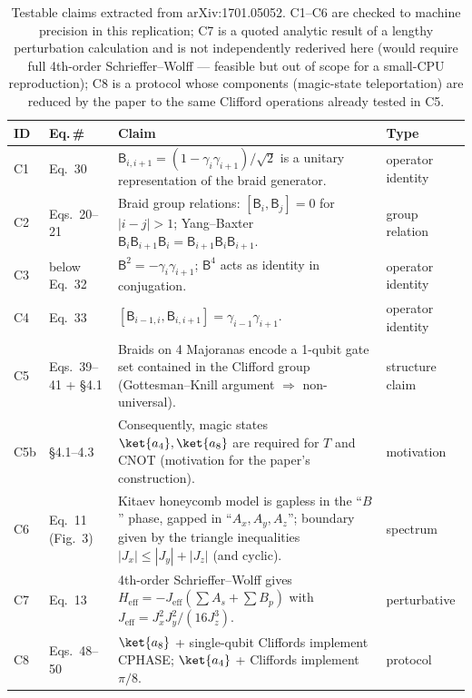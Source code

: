 \documentclass[11pt]{article}
\newcommand{\gam}{\gamma}
\newcommand{\B}{\mathsf{B}}
\begin{document}
\begin{table}[htbp]\centering
\small
\begin{tabular}{@{}p{0.9cm} p{1.5cm} p{9.4cm} p{2.3cm}@{}}
\toprule
\textbf{ID} & \textbf{Eq.\,\#} & \textbf{Claim} & \textbf{Type} \\\midrule
C1 & Eq.~30 & $\B_{i,i+1}=(1-\gam_i\gam_{i+1})/\sqrt 2$ is a unitary representation of the braid generator. & operator identity \\
C2 & Eqs.~20--21 & Braid group relations: $[\B_i,\B_j]=0$ for $|i-j|>1$; Yang--Baxter $\B_i\B_{i+1}\B_i=\B_{i+1}\B_i\B_{i+1}$. & group relation \\
C3 & below Eq.~32 & $\B^2 = -\gam_i\gam_{i+1}$; $\B^{4}$ acts as identity in conjugation. & operator identity \\
C4 & Eq.~33 & $[\B_{i-1,i},\B_{i,i+1}] = \gam_{i-1}\gam_{i+1}$. & operator identity \\
C5 & Eqs.~39--41 + \S4.1 & Braids on 4 Majoranas encode a 1-qubit gate set contained in the Clifford group (Gottesman--Knill argument $\Rightarrow$ non-universal). & structure claim \\
C5b & \S4.1--4.3 & Consequently, magic states $\ket{a_4},\ket{a_8}$ are required for $T$ and CNOT (motivation for the paper's construction). & motivation \\
C6 & Eq.~11 (Fig.~3) & Kitaev honeycomb model is gapless in the ``$B$'' phase, gapped in ``$A_x, A_y, A_z$''; boundary given by the triangle inequalities $|J_x|\le |J_y|+|J_z|$ (and cyclic). & spectrum \\
C7 & Eq.~13 & 4th-order Schrieffer--Wolff gives $H_\text{eff} = -J_\text{eff}(\sum A_s+\sum B_p)$ with $J_\text{eff}=J_x^2 J_y^2/(16 J_z^3)$. & perturbative \\
C8 & Eqs.~48--50 & $\ket{a_8}$ + single-qubit Cliffords implement CPHASE; $\ket{a_4}$ + Cliffords implement $\pi/8$. & protocol \\
\bottomrule
\end{tabular}
\caption{Testable claims extracted from arXiv:1701.05052. C1--C6 are checked to machine precision in this replication; C7 is a quoted analytic result of a lengthy perturbation calculation and is not independently rederived here (would require full 4th-order Schrieffer--Wolff --- feasible but out of scope for a small-CPU reproduction); C8 is a protocol whose components (magic-state teleportation) are reduced by the paper to the same Clifford operations already tested in C5.\label{tab:claims}}
\end{table}
\end{document}
